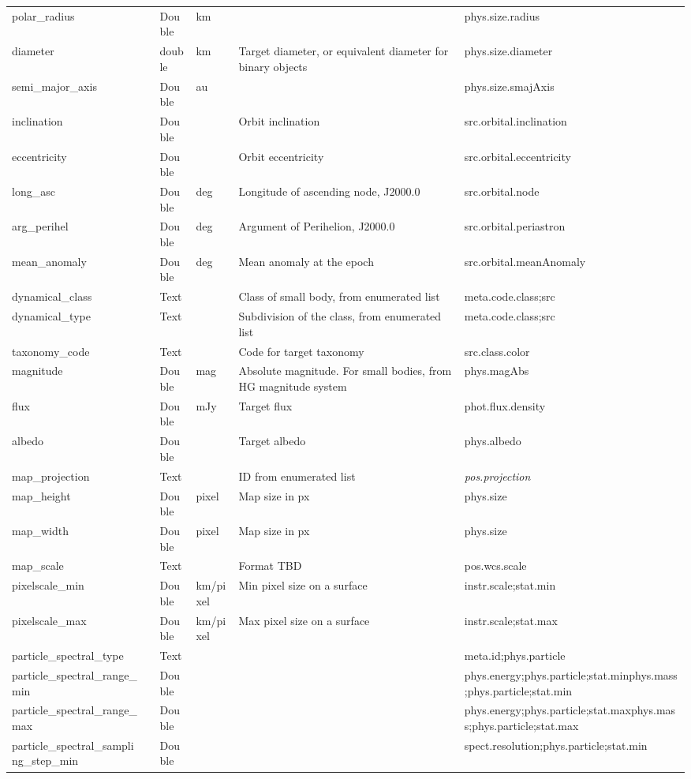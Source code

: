 \documentclass[11pt,a4paper]{ivoa}
\begin{document}
\begin{longtable}{p{3.5cm}p{0.5cm}p{1cm}p{1cm}p{7cm}p{3cm}}
polar\_radius&&Double&km&&phys.size.radius\\
diameter&&double&km&Target diameter, or equivalent diameter for binary objects&phys.size.diameter\\
semi\_major\_axis&&Double&au&&phys.size.smajAxis\\
inclination&&Double&&Orbit inclination&src.orbital.inclination\\
eccentricity&&Double&&Orbit eccentricity&src.orbital.eccentricity\\
long\_asc&&Double&deg&Longitude of ascending node, J2000.0&src.orbital.node\\
arg\_perihel&&Double&deg&Argument of Perihelion, J2000.0&src.orbital.periastron\\
mean\_anomaly&&Double&deg&Mean anomaly at the epoch&src.orbital.meanAnomaly\\
dynamical\_class&&Text&&Class of small body, from enumerated list&meta.code.class;src\\
dynamical\_type&&Text&&Subdivision of the class, from enumerated list&meta.code.class;src\\
taxonomy\_code&&Text&&Code for target taxonomy&src.class.color\\
magnitude&&Double&mag&Absolute magnitude. For small bodies, from HG magnitude system&phys.magAbs\\
flux&&Double&mJy&Target flux&phot.flux.density\\
albedo&&Double&&Target albedo&phys.albedo\\
map\_projection&&Text&&ID from enumerated list&\emph{pos.projection}\\
map\_height&&Double&pixel&Map size in px&phys.size\\
map\_width&&Double&pixel&Map size in px&phys.size\\
map\_scale&&Text&&Format TBD&pos.wcs.scale\\
pixelscale\_min&&Double&km/pixel&Min pixel size on a surface&instr.scale;stat.min\\
pixelscale\_max&&Double&km/pixel&Max pixel size on a surface&instr.scale;stat.max\\
particle\_spectral\_type&&Text&&&meta.id;phys.particle\\
particle\_spectral\_range\_min&&Double&&&phys.energy;phys.particle;stat.minphys.mass;phys.particle;stat.min\\
particle\_spectral\_range\_max&&Double&&&phys.energy;phys.particle;stat.maxphys.mass;phys.particle;stat.max\\
particle\_spectral\_sampling\_step\_min&&Double&&&spect.resolution;phys.particle;stat.min \\

\end{longtable}
\end{document}
